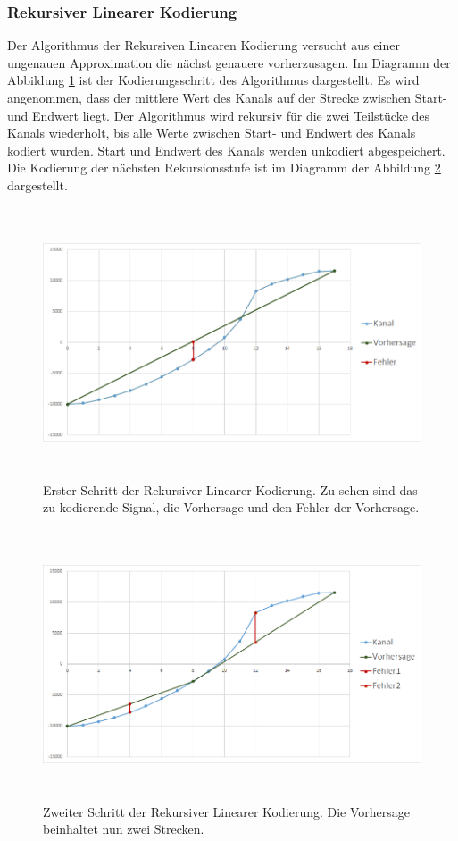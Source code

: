 \subsubsection{Rekursiver Linearer Kodierung}
Der Algorithmus der Rekursiven Linearen Kodierung versucht aus einer ungenauen Approximation die nächst genauere vorherzusagen. Im Diagramm der Abbildung \ref{konzept:loesung2:algorithm:step1} ist der Kodierungsschritt des Algorithmus dargestellt. Es wird angenommen, dass der mittlere Wert des Kanals auf der Strecke zwischen Start- und Endwert liegt. Der Algorithmus wird rekursiv für die zwei Teilstücke des Kanals wiederholt, bis alle Werte zwischen Start- und Endwert des Kanals kodiert wurden. Start und Endwert des Kanals werden unkodiert abgespeichert. Die Kodierung der nächsten Rekursionsstufe ist im Diagramm der Abbildung \ref{konzept:loesung2:algorithm:step2} dargestellt.
\begin{figure}[!htbp]
	\center
	\includegraphics[width=1\textwidth,height=8cm,keepaspectratio]{./pictures/konzept/solution2/algorithm_step1.png}
	\caption{Erster Schritt der Rekursiver Linearer Kodierung. Zu sehen sind das zu kodierende Signal, die Vorhersage und den Fehler der Vorhersage.}
	\label{konzept:loesung2:algorithm:step1}
\end{figure} 
\begin{figure}[!htbp]
	\center
	\includegraphics[width=1\textwidth,height=8cm,keepaspectratio]{./pictures/konzept/solution2/algorithm_step2.png}
	\caption{Zweiter Schritt der Rekursiver Linearer Kodierung. Die Vorhersage beinhaltet nun zwei Strecken.}
	\label{konzept:loesung2:algorithm:step2}
\end{figure} 

